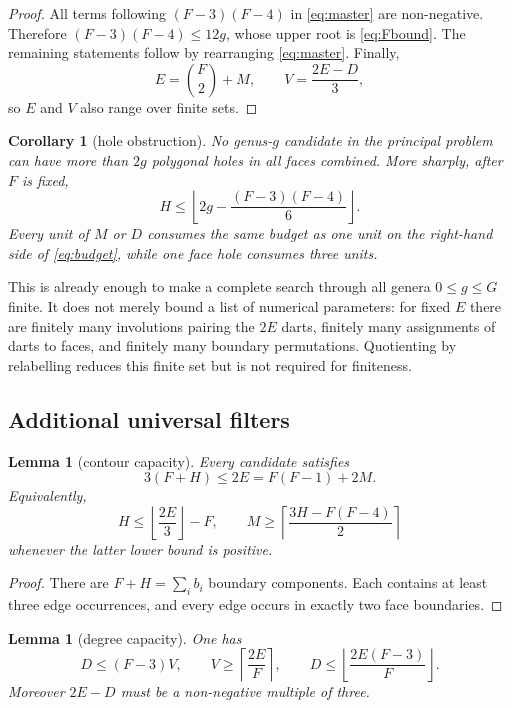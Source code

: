 \documentclass[11pt,a4paper]{article}
\newtheorem{lemma}[theorem]{Lemma}
\newtheorem{corollary}[theorem]{Corollary}
\theoremstyle{definition}
\newcommand{\binomFtwo}{\binom{F}{2}}
\begin{document}
\begin{proof}
All terms following $(F-3)(F-4)$ in \eqref{eq:master} are non-negative.
Therefore $(F-3)(F-4)\leq12g$, whose upper root is
\eqref{eq:Fbound}.  The remaining statements follow by rearranging
\eqref{eq:master}.  Finally,
\[
  E=\binomFtwo+M,
  \qquad
  V=\frac{2E-D}{3},
\]
so $E$ and $V$ also range over finite sets.
\end{proof}

\begin{corollary}[hole obstruction]\label{cor:holes}
No genus-$g$ candidate in the principal problem can have more than $2g$
polygonal holes in all faces combined.  More sharply, after $F$ is fixed,
\[
 H\leq
 \left\lfloor
 2g-\frac{(F-3)(F-4)}6
 \right\rfloor.
\]
Every unit of $M$ or $D$ consumes the same budget as one unit on the
right-hand side of \eqref{eq:budget}, while one face hole consumes three
units.
\end{corollary}

This is already enough to make a complete search through all genera
$0\leq g\leq G$ finite.  It does not merely bound a list of numerical
parameters: for fixed $E$ there are finitely many involutions pairing the
$2E$ darts, finitely many assignments of darts to faces, and finitely many
boundary permutations.  Quotienting by relabelling reduces this finite set
but is not required for finiteness.

\subsection{Additional universal filters}

\begin{lemma}[contour capacity]\label{lem:contours}
Every candidate satisfies
\begin{equation}\label{eq:contourcapacity}
  3(F+H)\leq2E=F(F-1)+2M.
\end{equation}
Equivalently,
\[
 H\leq\left\lfloor\frac{2E}{3}\right\rfloor-F,
 \qquad
 M\geq
 \left\lceil\frac{3H-F(F-4)}2\right\rceil
\]
whenever the latter lower bound is positive.
\end{lemma}

\begin{proof}
There are $F+H=\sum_i b_i$ boundary components.  Each contains at least
three edge occurrences, and every edge occurs in exactly two face
boundaries.
\end{proof}

\begin{lemma}[degree capacity]\label{lem:degree}
One has
\[
  D\leq(F-3)V,
  \qquad
  V\geq\left\lceil\frac{2E}{F}\right\rceil,
  \qquad
  D\leq\left\lfloor\frac{2E(F-3)}{F}\right\rfloor.
\]
Moreover $2E-D$ must be a non-negative multiple of three.
\end{lemma}
\end{document}
